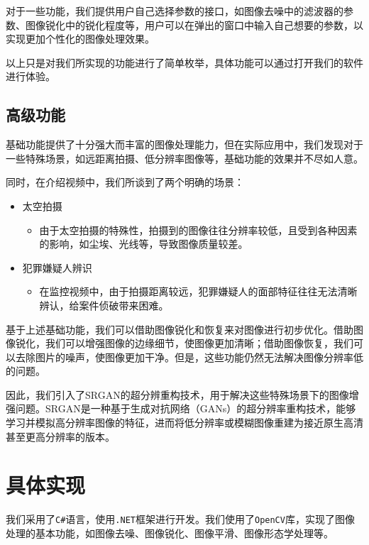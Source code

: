 \documentclass[UTF8,openany]{ctexbook}
\begin{document}
对于一些功能，我们提供用户自己选择参数的接口，如图像去噪中的滤波器的参数、图像锐化中的锐化程度等，用户可以在弹出的窗口中输入自己想要的参数，以实现更加个性化的图像处理效果。

以上只是对我们所实现的功能进行了简单枚举，具体功能可以通过打开我们的软件进行体验。

\section{高级功能}

基础功能提供了十分强大而丰富的图像处理能力，但在实际应用中，我们发现对于一些特殊场景，如远距离拍摄、低分辨率图像等，基础功能的效果并不尽如人意。

同时，在介绍视频中，我们所谈到了两个明确的场景：

\begin{itemize}
  \item 太空拍摄
  \begin{itemize}
    \item 由于太空拍摄的特殊性，拍摄到的图像往往分辨率较低，且受到各种因素的影响，如尘埃、光线等，导致图像质量较差。
  \end{itemize}
  \item 犯罪嫌疑人辨识
  \begin{itemize}
    \item 在监控视频中，由于拍摄距离较远，犯罪嫌疑人的面部特征往往无法清晰辨认，给案件侦破带来困难。
  \end{itemize}
\end{itemize}

基于上述基础功能，我们可以借助图像锐化和恢复来对图像进行初步优化。借助图像锐化，我们可以增强图像的边缘细节，使图像更加清晰；借助图像恢复，我们可以去除图片的噪声，使图像更加干净。但是，这些功能仍然无法解决图像分辨率低的问题。

因此，我们引入了SRGAN的超分辨重构技术，用于解决这些特殊场景下的图像增强问题。SRGAN是一种基于生成对抗网络（GANs）的超分辨率重构技术，能够学习并模拟高分辨率图像的特征，进而将低分辨率或模糊图像重建为接近原生高清甚至更高分辨率的版本。

\newpage

\chapter{具体实现}

我们采用了\texttt{C\#}语言，使用\texttt{.NET}框架进行开发。我们使用了\texttt{OpenCV}库，实现了图像处理的基本功能，如图像去噪、图像锐化、图像平滑、图像形态学处理等。
\end{document}
